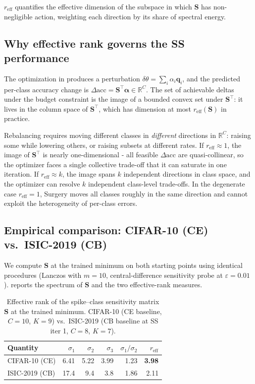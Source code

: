 \documentclass[11pt,a4paper]{article}
\newcommand{\mat}[1]{\bm{#1}}
\newcommand{\vect}[1]{\bm{#1}}
\begin{document}
$r_{\mathrm{eff}}$ quantifies the effective dimension of the subspace
in which $\mat{S}$ has non-negligible action, weighting each direction
by its share of spectral energy.

\subsection{Why effective rank governs the SS performance}

The optimization in  produces a perturbation
$\delta\theta = \sum_i \alpha_i \vect{q}_i$, and the predicted
per-class accuracy change is $\Delta\mathrm{acc} = \mat{S}^\top
\vect{\alpha} \in \mathbb{R}^C$. The set of achievable deltas under
the budget constraint is the image of a bounded convex set under
$\mat{S}^\top$: it lives in the column space of $\mat{S}^\top$, which
has dimension at most $r_{\mathrm{eff}}(\mat{S})$ in practice.

Rebalancing requires moving different classes in \emph{different}
directions in $\mathbb{R}^C$: raising some while lowering others, or
raising subsets at different rates. If $r_{\mathrm{eff}} \approx 1$,
the image of $\mat{S}^\top$ is nearly one-dimensional - all feasible
$\Delta\mathrm{acc}$ are quasi-collinear, so the optimizer faces a
single collective trade-off that it can saturate in one iteration.
If $r_{\mathrm{eff}} \approx k$, the image spans $k$ independent
directions in class space, and the optimizer can resolve $k$
independent class-level trade-offs. In the degenerate case
$r_{\mathrm{eff}} = 1$, Surgery moves all classes roughly in the same
direction and cannot exploit the heterogeneity of per-class errors.

\subsection{Empirical comparison: CIFAR-10 (CE) vs.\ ISIC-2019 (CB)}

We compute $\mat{S}$ at the trained minimum on both starting points
using identical procedures (Lanczos with $m=10$, central-difference
sensitivity probe at $\varepsilon = 0.01$). 
reports the spectrum of $\mat{S}$ and the two effective-rank
measures.

\begin{table}[ht]
\centering
\caption{Effective rank of the spike--class sensitivity matrix
$\mat{S}$ at the trained minimum. CIFAR-10 (CE baseline, $C=10$,
$K=9$) vs.\ ISIC-2019 (CB baseline at SS iter 1, $C=8$, $K=7$).}
\label{tab:effective-rank}
\begin{tabular}{lrrrrr}
\toprule
Quantity & $\sigma_1$ & $\sigma_2$ & $\sigma_3$ & $\sigma_1/\sigma_2$
  & $r_{\mathrm{eff}}$ \\
\midrule
CIFAR-10 (CE) & 6.41 & 5.22 & 3.99 & 1.23 & \textbf{3.98} \\
ISIC-2019 (CB) & 17.4 & 9.4 & 3.8 & 1.86 & 2.11 \\
\bottomrule
\end{tabular}
\end{table}
\end{document}
